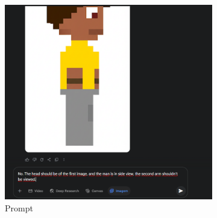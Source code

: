 \begin{figure}[htbp]
    \centering
    \caption{\small Processo da geração 18 do sprite em side view no Gemini Pro em julho/2025}
    \label{fig:geminiPro18}

    \begin{subfigure}{0.8\linewidth}
        \includegraphics[width=1\linewidth]{figs/geminiPro/chat6/tela2.PNG}
        \caption{\small Prompt}
        \label{fig:geminiPro18Prompt}
    \end{subfigure}
    \begin{subfigure}{0.23\linewidth}

\end{subfigure}
\end{figure}

